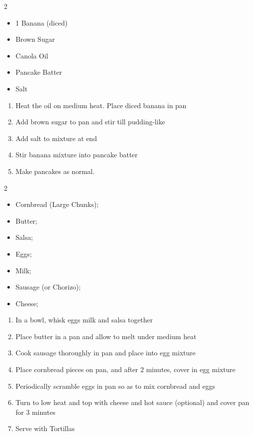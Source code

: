 \documentclass[oneside]{recipe}
\newcommand{\recipecolumn}[2]{
	\begin{multicols}{2}
	\raggedcolumns
	#1
	\columnbreak
	#2
	\end{multicols}
}
\begin{document}
\newpage
{}
\recipecolumn{
	\begin{itemize}
		\item 1 Banana (diced)
		\item Brown Sugar
		\item Canola Oil
		\item Pancake Batter
		\item Salt
	\end{itemize}
}{
	\begin{enumerate}
	\item Heat the oil on medium heat. Place diced banana in pan
	\item Add brown sugar to pan and stir till pudding-like 
	\item Add salt to mixture at end
	\item Stir banana mixture into pancake batter
	\item Make pancakes as normal.
	\end{enumerate}	
}

\recipecolumn{
	\begin{itemize}
		\item Cornbread (Large Chunks);
		\item Butter;
		\item Salsa;
		\item Eggs;
		\item Milk;
		\item Sausage (or Chorizo);
		\item Cheese;
	\end{itemize}
}{
	\begin{enumerate}
		\item In a bowl, whisk eggs milk and salsa together
		\item Place butter in a pan and allow to melt under medium heat
		\item Cook sausage thoroughly in pan and place into egg mixture
		\item Place cornbread pieces on pan, and after 2 minutes, cover in egg mixture
		\item Periodically scramble eggs in pan so as to mix cornbread and eggs
		\item Turn to low heat and top with cheese and hot sauce (optional) and cover pan for 3 minutes
		\item Serve with Tortillas
	\end{enumerate}
} 
\end{document}
